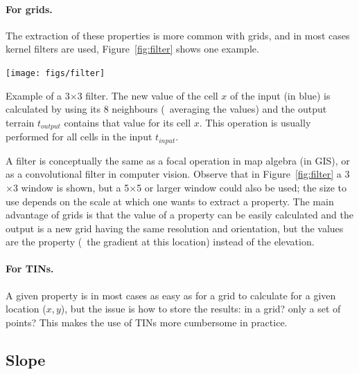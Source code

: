 \paragraph{For grids.}
The extraction of these properties is more common with grids, and in most cases kernel filters are used, Figure~\ref{fig:filter} shows one example.
\begin{marginfigure}
  \centering
  \texttt{[image: figs/filter]}
  \caption{Example of a 3$\times$3 filter. The new value of the cell $x$ of the input (in blue) is calculated by using its 8 neighbours (\eg\ averaging the values) and the output terrain $t_{output}$ contains that value for its cell $x$. This operation is usually performed for all cells in the input $t_{input}$.}%
\label{fig:filter}
\end{marginfigure}%
A filter is conceptually the same as a focal operation in map algebra (in GIS), or as a convolutional filter in computer vision.
Observe that in Figure~\ref{fig:filter} a 3$\times$3 window is shown, but a 5$\times$5%
or larger window could also be used; the size to use depends on the scale at which one wants to extract a property.
The main advantage of grids is that the value of a property can be easily calculated and the output is a new grid having the same resolution and orientation, but the values are the property (\eg\ the gradient at this location) instead of the elevation.

\paragraph{For TINs.}
A given property is in most cases as easy as for a grid to calculate for a given location ($x,y$), but the issue is how to store the results: in a grid? only a set of points?
This makes the use of TINs more cumbersome in practice.



%
\subsection{Slope}%

